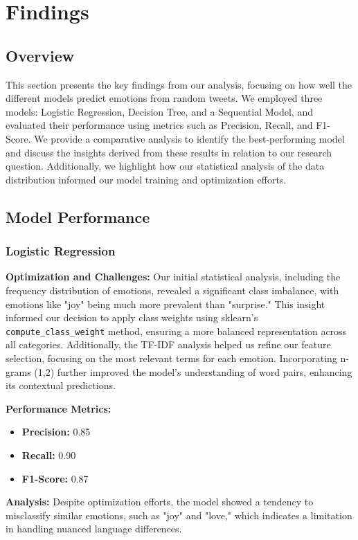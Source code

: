 \section{Findings}

\subsection{Overview}
This section presents the key findings from our analysis, focusing on how well the different models predict emotions from random tweets. We employed three models: Logistic Regression, Decision Tree, and a Sequential Model, and evaluated their performance using metrics such as Precision, Recall, and F1-Score. We provide a comparative analysis to identify the best-performing model and discuss the insights derived from these results in relation to our research question. Additionally, we highlight how our statistical analysis of the data distribution informed our model training and optimization efforts.

\subsection{Model Performance}

\subsubsection{Logistic Regression}
\textbf{Optimization and Challenges:} Our initial statistical analysis, including the frequency distribution of emotions, revealed a significant class imbalance, with emotions like "joy" being much more prevalent than "surprise." This insight informed our decision to apply class weights using sklearn's \texttt{compute\_class\_weight} method, ensuring a more balanced representation across all categories. Additionally, the TF-IDF analysis helped us refine our feature selection, focusing on the most relevant terms for each emotion. Incorporating n-grams (1,2) further improved the model's understanding of word pairs, enhancing its contextual predictions.

\textbf{Performance Metrics:}
\begin{itemize}
  \item \textbf{Precision:} 0.85
  \item \textbf{Recall:} 0.90
  \item \textbf{F1-Score:} 0.87
\end{itemize}

\textbf{Analysis:} Despite optimization efforts, the model showed a tendency to misclassify similar emotions, such as "joy" and "love," which indicates a limitation in handling nuanced language differences.

